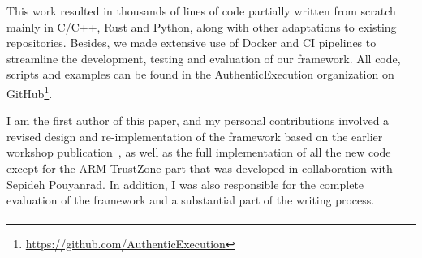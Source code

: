 This work resulted in thousands of lines of code partially written from scratch
mainly in C/C++, Rust and Python, along with other adaptations to existing
repositories. Besides, we made extensive use of Docker and \ac{CI} pipelines to
streamline the development, testing and evaluation of our framework. All code,
scripts and examples can be found in the AuthenticExecution organization on
GitHub\footnote{\url{https://github.com/AuthenticExecution}}.

I am the first author of this paper, and my personal contributions involved a
revised design and re-implementation of the framework based on the earlier
workshop publication~\cite{noorman:authentic-execution}, as well as the full
implementation of all the new code except for the ARM TrustZone part that was
developed in collaboration with Sepideh Pouyanrad. In addition, I was also
responsible for the complete evaluation of the framework and a substantial part
of the writing process.

\begin{formal}
    \paperauthexecrefr{}
\end{formal}

\paragraph{\papercloudtitle}

